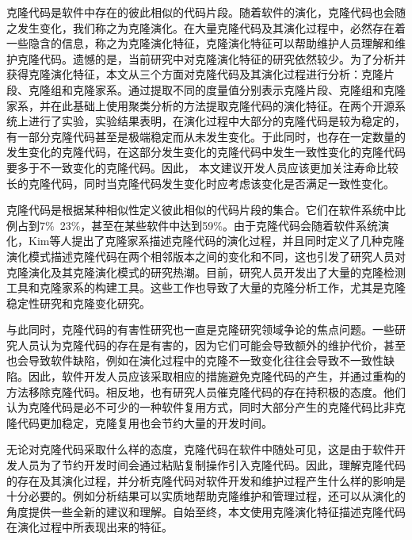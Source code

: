

克隆代码是软件中存在的彼此相似的代码片段。随着软件的演化，克隆代码也会随之发生变化，我们称之为克隆演化。在大量克隆代码及其演化过程中，必然存在着一些隐含的信息，称之为克隆演化特征，克隆演化特征可以帮助维护人员理解和维护克隆代码。遗憾的是，当前研究中对克隆演化特征的研究依然较少。为了分析并获得克隆演化特征，本文从三个方面对克隆代码及其演化过程进行分析：克隆片段、克隆组和克隆家系。通过提取不同的度量值分别表示克隆片段、克隆组和克隆家系，并在此基础上使用聚类分析的方法提取克隆代码的演化特征。在两个开源系统上进行了实验，实验结果表明，在演化过程中大部分的克隆代码是较为稳定的，有一部分克隆代码甚至是极端稳定而从未发生变化。于此同时，也存在一定数量的发生变化的克隆代码，在这部分发生变化的克隆代码中发生一致性变化的克隆代码要多于不一致变化的克隆代码。因此， 本文建议开发人员应该更加关注寿命比较长的克隆代码，同时当克隆代码发生变化时应考虑该变化是否满足一致性变化。

克隆代码是根据某种相似性定义彼此相似的代码片段的集合\cite{roy2007survey}。它们在软件系统中比例占到7\%~23\%，甚至在某些软件中达到59\%\cite{koschke2007survey}。由于克隆代码会随着软件系统演化，Kim等人提出了克隆家系描述克隆代码的演化过程，并且同时定义了几种克隆演化模式描述克隆代码在两个相邻版本之间的变化和不同\cite{kim2005empirical}，这也引发了研究人员对克隆演化及其克隆演化模式的研究热潮。目前，研究人员开发出了大量的克隆检测工具和克隆家系的构建工具。这些工作也导致了大量的克隆分析工作，尤其是克隆稳定性研究和克隆变化研究\cite{inoue2012experience}\cite{krinke2008cloned}。

与此同时，克隆代码的有害性研究也一直是克隆研究领域争论的焦点问题。一些研究人员认为克隆代码的存在是有害的，因为它们可能会导致额外的维护代价\cite{kapser2006cloning}，甚至也会导致软件缺陷，例如在演化过程中的克隆不一致变化往往会导致不一致性缺陷\cite{inoue2012experience}。因此，软件开发人员应该采取相应的措施避免克隆代码的产生，并通过重构的方法移除克隆代码。相反地，也有研究人员催克隆代码的存在持积极的态度。他们认为克隆代码是必不可少的一种软件复用方式，同时大部分产生的克隆代码比非克隆代码更加稳定，克隆复用也会节约大量的开发时间\cite{krinke2008cloned}。

无论对克隆代码采取什么样的态度，克隆代码在软件中随处可见，这是由于软件开发人员为了节约开发时间会通过粘贴复制操作引入克隆代码。因此，理解克隆代码的存在及其演化过程，并分析克隆代码对软件开发和维护过程产生什么样的影响是十分必要的。例如分析结果可以实质地帮助克隆维护和管理过程，还可以从演化的角度提供一些全新的建议和理解。自始至终，本文使用克隆演化特征描述克隆代码在演化过程中所表现出来的特征。

